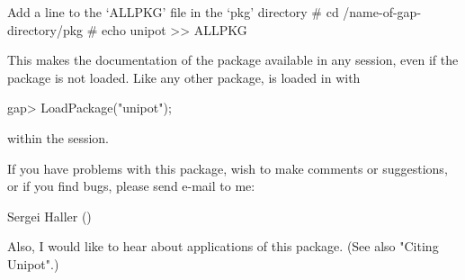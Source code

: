 Add a line to the `ALLPKG' file in the `pkg' directory
\begintt
# cd /name-of-gap-directory/pkg
# echo unipot >> ALLPKG
\endtt

This makes the  documentation  of the package  available  in any  {}
session,  even  if the  package  is not loaded. Like  any other  package,
{\Unipot} is loaded in {\GAP} with

\beginexample
gap> LoadPackage("unipot");
\endexample

within the {} session.

If you have problems with this package, wish to make comments
or suggestions, or if you find bugs, please send e-mail to me:

Sergei Haller ()

Also, I would like to hear about applications of this package.
(See also "Citing Unipot".)




